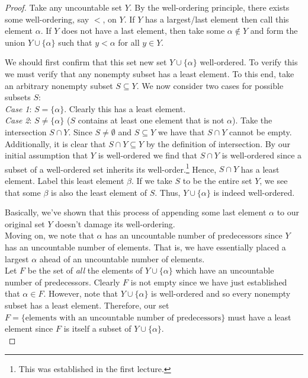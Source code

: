 \documentclass[12pt]{article}
\newlength\tindent
\renewcommand{\indent}{\hspace*{\tindent}}
\begin{document}
\begin{proof} Take any uncountable set $Y$. By the well-ordering principle, there exists some well-ordering, say $<$, on $Y$. If $Y$ has a largest/last element then call this element $\alpha$. If $Y$ does not have a last element, then take some $\alpha \notin Y$ and form the union $Y \cup \{\alpha\}$ such that $y < \alpha$ for all $y \in Y$.

\indent We should first confirm that this set new set $Y \cup \{\alpha\}$ well-ordered. To verify this we must verify that any nonempty subset has a least element. To this end, take an arbitrary nonempty subset $S \subseteq Y$. We now consider two cases for possible subsets $S$: \\

{\em Case 1}: $S = \{\alpha\}$. Clearly this has a least element.\\

{\em Case 2}: $S \neq \{\alpha\}$ ($S$ contains at least one element that is not $\alpha$). Take the intersection $S \cap Y$. Since $S \neq \emptyset$ and $S \subseteq Y$ we have that $S \cap Y$ cannot be empty. Additionally, it is clear that $S \cap Y \subseteq Y$ by the definition of intersection. By our initial assumption that $Y$ is well-ordered we find that $S \cap Y$ is well-ordered since a subset of a well-ordered set inherits its well-order.\footnote{This was established in the first lecture.} Hence, $S \cap Y$ has a least element. Label this least element $\beta$. If we take $S$ to be the entire set $Y$, we see that some $\beta$ is also the least element of $S$. Thus, $Y \cup \{\alpha\}$ is indeed well-ordered.

\indent Basically, we've shown that this process of appending some last element $\alpha$ to our original set $Y$ doesn't damage its well-ordering. \\

\indent Moving on, we note that $\alpha$ has an uncountable number of predecessors since $Y$ has an uncountable number of elements. That is, we have essentially placed a largest $\alpha$ ahead of an uncountable number of elements. \\

\indent Let $F$ be the set of {\em all} the elements of $Y \cup \{\alpha\}$ which have an uncountable number of predecessors. Clearly $F$ is not empty since we have just established that $\alpha \in F$. However, note that $Y \cup \{\alpha\}$ is well-ordered and so every nonempty subset has a least element. Therefore, our set $F = \{ \text{elements with an uncountable number of predecessors} \}$ must have a least element since $F$ is itself a subset of $Y \cup \{\alpha\}$. \\


\end{proof}
\end{document}

